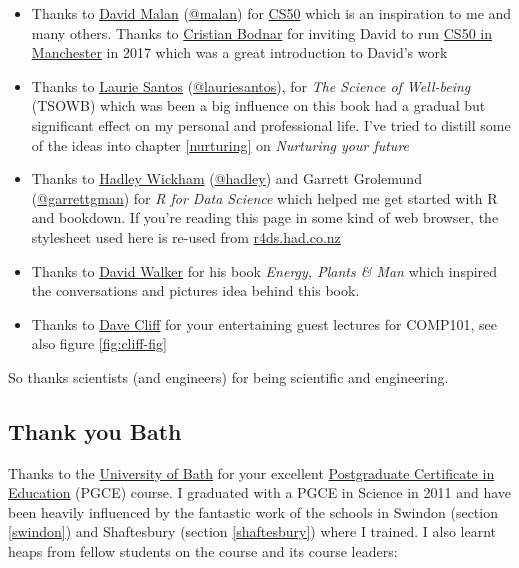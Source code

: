 \documentclass[
]{book}
\providecommand{\tightlist}{%
  \setlength{\itemsep}{0pt}\setlength{\parskip}{0pt}}
\begin{document}
\begin{itemize}
\tightlist
\item
  Thanks to \href{https://en.wikipedia.org/wiki/David_J._Malan}{David Malan} (\href{https://cs.harvard.edu/malan/}{@malan}) for \href{https://en.wikipedia.org/wiki/CS50}{CS50} which is an inspiration to me and many others. \citep{cs50, cs50zoom, CS502021} Thanks to \href{https://crisbodnar.github.io/}{Cristian Bodnar} for inviting David to run \href{http://cs50.hacksoc.com}{CS50 in Manchester} in 2017 which was a great introduction to David's work \citep{cs50mcr}
\item
  Thanks to \href{https://en.wikipedia.org/wiki/Laurie_R._Santos}{Laurie Santos} (\href{https://twitter.com/lauriesantos}{@lauriesantos}), for \emph{The Science of Well-being} (TSOWB) \citep{lauriesantos} which was been a big influence on this book had a gradual but significant effect on my personal and professional life. I've tried to distill some of the ideas into chapter \ref{nurturing} on \emph{Nurturing your future}
\item
  Thanks to \href{https://en.wikipedia.org/wiki/Hadley_Wickham}{Hadley Wickham} (\href{https://github.com/hadley}{@hadley}) and Garrett Grolemund (\href{https://github.com/garrettgman}{@garrettgman}) for \emph{R for Data Science} \citep{r4ds} which helped me get started with R and bookdown. If you're reading this page in some kind of web browser, the stylesheet used here is re-used from \href{https://r4ds.had.co.nz/}{r4ds.had.co.nz}
\item
  Thanks to \href{https://en.wikipedia.org/wiki/David_A._Walker_(scientist)}{David Walker} for his book \emph{Energy, Plants \& Man} which inspired the conversations and pictures idea behind this book. \citep{epm}
\item
  Thanks to \href{https://en.wikipedia.org/wiki/Dave_Cliff_(computer_scientist)}{Dave Cliff} for your entertaining guest lectures for COMP101, see also figure \ref{fig:cliff-fig}
\end{itemize}

So thanks scientists (and engineers) for being scientific and engineering. 🙏

\hypertarget{bath}{%
\subsection{Thank you Bath}\label{bath}}

Thanks to the \href{https://en.wikipedia.org/wiki/University_of_Bath}{University of Bath} for your excellent \href{https://en.wikipedia.org/wiki/Postgraduate_Certificate_in_Education}{Postgraduate Certificate in Education} (PGCE) course. I graduated with a PGCE in Science in 2011 and have been heavily influenced by the fantastic work of the schools in Swindon (section \ref{swindon}) and Shaftesbury (section \ref{shaftesbury}) where I trained. I also learnt heaps from fellow students on the course and its course leaders:
\end{document}
